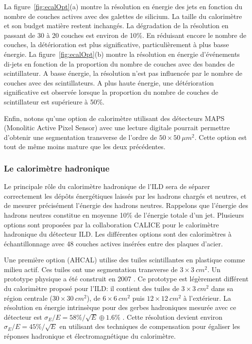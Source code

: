 La figure~\ref{fig:ecalOpt}(a) montre la résolution en énergie des jets en fonction du nombre de couches actives avec des galettes de silicium. La taille du calorimètre et son budget matière restent inchangés. La dégradation de la résolution en passant de 30 à 20 couches est environ de 10$\%$.  En réduisant encore le nombre de couches, la détérioration est plus significative, particulièrement à plus basse énergie. La figure~\ref{fig:ecalOpt}(b) montre la résolution en énergie d'événements di-jets en fonction de la proportion du nombre de couches avec des bandes de scintillateur. A basse énergie, la résolution n'est pas influencée par le nombre de couches avec des scintillateurs. A plus haute énergie, une détérioration significative est observée lorsque la proportion du nombre de couches de scintillateur est supérieure à 50$\%$.

Enfin, notons qu'une option de calorimètre utilisant des détecteurs MAPS (Monolitic Active Pixel Sensor) avec une lecture digitale pourrait permettre d'obtenir une segmentation transverse de l'ordre de $50\times50~\mu m^2$. Cette option est tout de même moins mature que les deux précédentes. 

\subsubsection{Le calorimètre hadronique}
Le principale rôle du calorimètre hadronique de l'ILD sera de séparer correctement les dépôts énergétiques laissés par les hadrons chargés et neutres, et de mesurer précisément l'énergie des hadrons neutres. Rappelons que l'énergie des  hadrons neutres constitue en moyenne 10$\%$ de l'énergie totale d'un jet. Plusieurs options sont proposées par la collaboration CALICE pour le calorimètre hadronique du détecteur ILD. Les différentes options sont des calorimètres à échantillonnage avec 48 couches actives insérées entre des plaques d'acier. 

Une première option (AHCAL) utilise des tuiles scintillantes en plastique comme milieu actif. Ces tuiles ont une segmentation transverse de $3\times3~cm^2$. Un prototype physique a été construit en 2007 \cite{ahcal-construction}. Ce prototype est légèrement différent du calorimètre proposé pour l'ILD: il contient des tuiles de $3\times3~cm^2$ dans sa région centrale ($30\times30~cm^2$), de $6\times6~cm^2$ puis $12\times12~cm^2$ à l'extérieur. La résolution en énergie intrinsèque pour des gerbes hadroniques mesurée avec ce détecteur est $\sigma_E/E=58\%/\sqrt{E}\oplus1.6\%$ \cite{ahcal-energy}. Cette résolution devient environ $\sigma_E/E=45\%/\sqrt{E}$ en utilisant des techniques de compensation pour égaliser les réponses hadronique et électromagnétique du calorimètre. 

